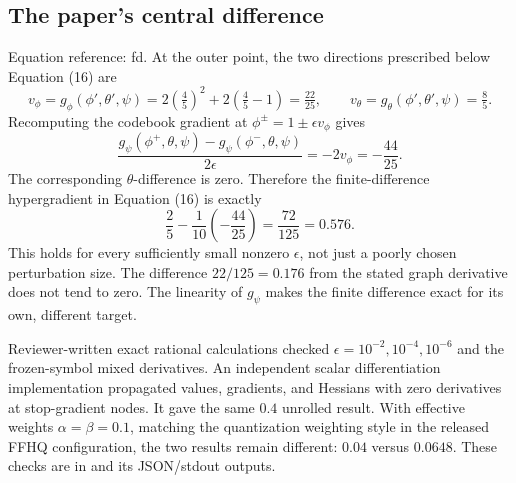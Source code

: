 \documentclass[10pt]{article}
\begin{document}
\subsection*{The paper’s central difference}
Equation reference: fd. At the outer point, the two directions prescribed below Equation (16) are \[v_\phi=g_\phi(\phi',\theta',\psi)
       =2(\tfrac45)^2+2(\tfrac45-1)=\tfrac{22}{25},
 \qquad
 v_\theta=g_\theta(\phi',\theta',\psi)=\tfrac85.\] Recomputing the codebook gradient at \(\phi^\pm=1\pm\epsilon v_\phi\) gives \[\frac{g_\psi(\phi^+,\theta,\psi)
           -g_\psi(\phi^-,\theta,\psi)}{2\epsilon}
       =-2v_\phi=-\frac{44}{25}.\] The corresponding \(\theta\)-difference is zero. Therefore the finite-difference hypergradient in Equation (16) is exactly \[
 \frac25-\frac1{10}\left(-\frac{44}{25}\right)
   =\boxed{\frac{72}{125}=0.576}.\] This holds for every sufficiently small nonzero \(\epsilon\), not just a poorly chosen perturbation size. The difference \(22/125=0.176\) from the stated graph derivative does not tend to zero. The linearity of \(g_\psi\) makes the finite difference exact for its own, different target.\par
Reviewer-written exact rational calculations checked \(\epsilon=10^{-2},10^{-4},10^{-6}\) and the frozen-symbol mixed derivatives. An independent scalar differentiation implementation propagated values, gradients, and Hessians with zero derivatives at stop-gradient nodes. It gave the same \(0.4\) unrolled result. With effective weights \(\alpha=\beta=0.1\), matching the quantization weighting style in the released FFHQ configuration, the two results remain different: \(0.04\) versus \(0.0648\). These checks are in and its JSON/stdout outputs.\par
\end{document}
